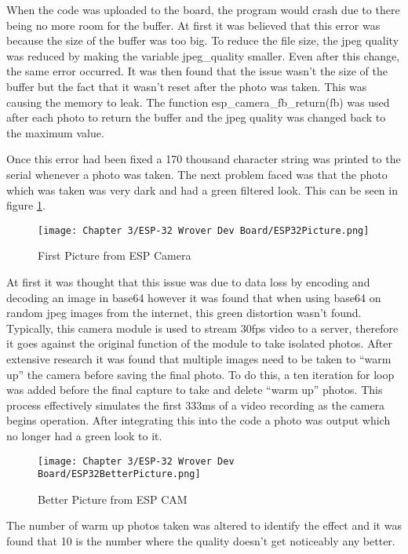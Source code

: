 When the code was uploaded to the board, the program would crash due to there being no more room for the buffer.
At first it was believed that this error was because the size of the buffer was too big.
To reduce the file size, the jpeg quality was reduced by making the variable jpeg\_quality smaller.
Even after this change, the same error occurred.
It was then found that the issue wasn't the size of the buffer but the fact that it wasn't reset after the photo was taken.
This was causing the memory to leak.
The function esp\_camera\_fb\_return(fb) was used after each photo to return the buffer and the jpeg quality was changed back to the maximum value.

Once this error had been fixed a 170 thousand character string was printed to the serial whenever a photo was taken.
The next problem faced was that the photo which was taken was very dark and had a green filtered look.
This can be seen in figure \ref{fig:espcamfp}.

\begin{figure}[H]        
    \centering
    \texttt{[image: Chapter 3/ESP-32 Wrover Dev Board/ESP32Picture.png]}
    \caption{First Picture from ESP Camera}
    \label{fig:espcamfp}
\end{figure} 

At first it was thought that this issue was due to data loss by encoding and decoding an image in base64 however it was found that when using base64 on random jpeg images from the internet, this green distortion wasn't found.
Typically, this camera module is used to stream 30fps video to a server, therefore it goes against the original function of the module to take isolated photos.
After extensive research it was found that multiple images need to be taken to “warm up” the camera before saving the final photo.
To do this, a ten iteration for loop was added before the final capture to take and delete “warm up” photos.
This process effectively simulates the first 333ms of a video recording as the camera begins operation.
After integrating this into the code a photo was output which no longer had a green look to it.

\begin{figure}[H]        
    \centering
    \texttt{[image: Chapter 3/ESP-32 Wrover Dev Board/ESP32BetterPicture.png]}
    \caption{Better Picture from ESP CAM}
    \label{fig:espcambetterpic}
\end{figure} 

The number of warm up photos taken was altered to identify the effect and it was found that 10 is the number where the quality doesn't get noticeably any better.

